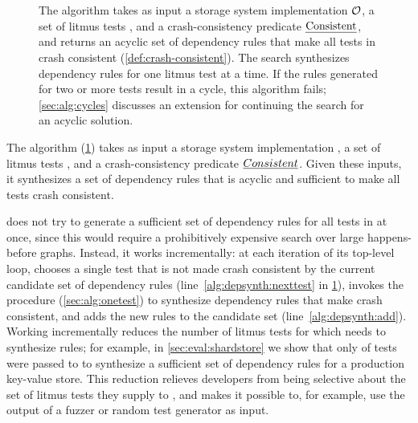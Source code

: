 \begin{figure}
    \centering
    {\xsmall}
    \caption{The \depsynth algorithm takes as input a storage system implementation $\mathcal{O}$,
    a set of litmus tests \tests, and a crash-consistency predicate $\textrm{\emph{Consistent}}$,
    and returns an acyclic set of dependency rules that make all tests in \tests crash consistent (\cref{def:crash-consistent}).
    The search synthesizes dependency rules for one litmus test at a time.
    If the rules generated for two or more tests result in a cycle,
    this algorithm fails; \cref{sec:alg:cycles} discusses an extension for continuing 
    the search for an acyclic solution.}
    \label{fig:alg:depsynth}
\end{figure}

The \depsynthalg algorithm (\cref{fig:alg:depsynth})
takes as input a storage system implementation \sys,
a set of litmus tests \tests,
and a crash-consistency predicate $\emph{Consistent}$.
Given these inputs,
it synthesizes a set of dependency rules
that is acyclic and sufficient to make all tests \tests crash consistent.

\depsynthalg does not try to generate a sufficient set of dependency rules
for all tests in \tests at once,
since this would require a prohibitively expensive search
over large happens-before graphs.
Instead, it works incrementally:
at each iteration of its top-level loop,
\depsynthalg chooses a single test \test that is not made crash consistent
by the current candidate set of dependency rules (line~\ref{alg:depsynth:nexttest} in \cref{fig:alg:depsynth}), 
invokes the procedure  (\cref{sec:alg:onetest})
to synthesize dependency rules that make \test crash consistent,
and adds the new rules to the candidate set (line~\ref{alg:depsynth:add}).
Working incrementally reduces the number of litmus tests
for which \depsynthalg needs to synthesize rules;
for example, in \cref{sec:eval:shardstore} we show that only \shardstoretestsused of \shardstoreinputtests tests
were passed to  to synthesize a sufficient set of dependency rules
for a production key-value store.
This reduction relieves developers from being selective about the set of litmus tests they supply to \depsynth,
and makes it possible to, for example, use the output of a fuzzer or random test generator as input.

